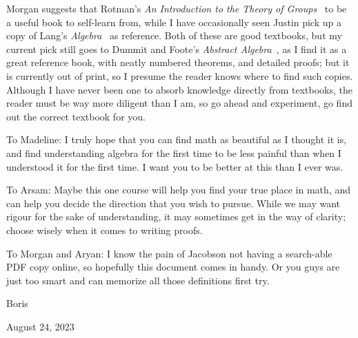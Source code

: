 Morgan suggests that Rotman's \textit{An Introduction to the Theory of Groups}~\cite{rotman}
to be a useful book to self-learn from,
while I have occasionally seen Justin
pick up a copy of Lang's \textit{Algebra}~\cite{lang} as reference.
Both of these are good textbooks,
but my current pick still goes to Dummit and Foote's \textit{Abstract Algebra}~\cite{dummitfoote},
as I find it as a great reference book,
with neatly numbered theorems, and detailed proofs;
but it is currently out of print,
so I presume the reader knows where to find such copies.
Although I have never been one to absorb knowledge directly from textbooks,
the reader must be way more diligent than I am,
so go ahead and experiment,
go find out the correct textbook for you.

\medskip

To Madeline:
I truly hope that you can find math as beautiful as I thought it is,
and find understanding algebra for the first time
to be less painful than when I understood it for the first time.
I want you to be better at this than I ever was.

To Arsam:
Maybe this one course will help you find your true place in math,
and can help you decide the direction that you wish to pursue.
While we may want rigour for the sake of understanding,
it may sometimes get in the way of clarity;
choose wisely when it comes to writing proofs.

To Morgan and Aryan:
I know the pain of
Jacobson not having a search-able PDF copy online,
so hopefully this document comes in handy.
Or you guys are just too smart
and can memorize all those definitions first try.

\medskip

Boris

August 24, 2023




